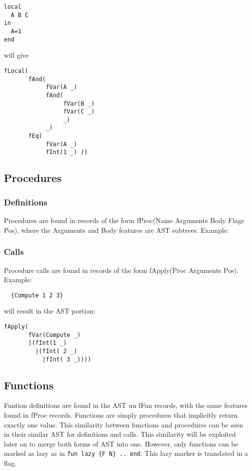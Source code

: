 \documentclass[a4paper]{memoir}
\begin{document}
\begin{lstlisting}
local
  A B C
in
  A=1
end
\end{lstlisting}
will give
\begin{verbatim}
fLocal(
       fAnd(
            fVar(A _) 
            fAnd(
                 fVar(B _) 
                 fVar(C _) 
                 _) 
            _) 
       fEq( 
            fVar(A _) 
            fInt(1 _) ))
\end{verbatim}

\subsection{Procedures}
\subsubsection{Definitions}
Procedures are found in records of the form fProc(Name Arguments Body Flags Pos), where the Arguments and Body features are AST subtrees. %
Example:

\subsubsection{Calls}
Procedure calls are found in records of the form fApply(Proc Arguments Pos). 
Example:

\begin{lstlisting}
  {Compute 1 2 3}
\end{lstlisting}

will result in the AST portion:
\begin{verbatim}
fApply(
       fVar(Compute _)
       |(fInt(1 _)
         |(fInt( 2 _)
           |fInt( 3 _))))
\end{verbatim}

\subsection{Functions}                                                         
Funtion definitions are found in the AST un fFun records, with the same features found in fProc records. Functions are simply procedures that implicitly return exactly one value. This similarity between functions and procedures can be seen in their similar AST for definitions and calls. This similarity will be exploited later on to merge both forms of AST into one.
However, only functions can be marked as lazy as in \lstinline!fun lazy {F N} .. end!. This lazy marker is translated in a flag.
\end{document}
